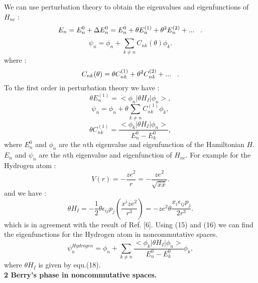 \documentclass[a4paper,a4paper]{article}
\begin{document}
We can use perturbation theory to
obtain the eigenvalues and eigenfunctions of $H_{nc}$ :
\begin{equation}
E_{n}=E^{0}_{n}+\Delta E^{0}_{n}=E^{0}_{n}+\theta E^{(1)}_{n}+\theta^{2}
E^{(2)}_{n}+...\hspace{.3cm} .
\end{equation}
\begin{equation}
\psi_{n}=\phi_{n}+ \sum_{k\neq n}C_{nk}(\theta)\phi_{k} .
\end{equation}
where :
\begin{equation}
C_{nk}(\theta)=\theta C^{(1)}_{nk}+\theta^{2} C^{(2)}_{nk}+...\hspace{.3cm}
.
\end{equation}
To the first order in perturbation theory we have :
\begin{equation}
\theta E^{(1)}_{n}= <\phi_{n}|\theta H_{I} |\phi_{n}> ,
\end{equation}
\begin{equation}
\psi_{n}=\phi_{n}+\theta \sum_{k\neq n}C^{(1)}_{nk}\phi_{k} ,
\end{equation}
\begin{equation}
\theta C^{(1)}_{nk}=\frac{<\phi_{k}|\theta
H_{I}|\phi_{n}>}{E^{0}_{n}-E_{k}^{0}} ,
\end{equation}
where $E^{0}_{n}$ and $\phi_{n}$ are the $n$th eigenvalue and
eigenfunction of the Hamiltonian $H$. $E_{n}$ and $\psi_{n}$ are
the $n$th eigenvalue and eigenfunction of $H_{nc}$. For example
for the Hydrogen atom :
\begin{equation}
V(r)=-\frac{ze^{2}}{r}=-\frac{ze^{2}}{\sqrt{\hat{x}\hat{x}}} .
\end{equation}
and we have :
\begin{equation}
\theta H_{I}=-\frac{1}{2}\theta
\epsilon_{ij}p_{j}(\frac{x^{i}ze^{2}}{r^{3}})=-ze^{2}\theta\frac{x_{i}\epsilon_{ij}p_{j}}{2r^{3}}
.
\end{equation}
which is in agreement with the result of Ref. [6]. Using (15) and
(16) we can find the eigenfunctions for the Hydrogen atom in
noncommutative spaces.
\begin{equation}
\psi_{n}^{Hydrogen}=\phi_{n}+ \sum_{k\neq n}\frac{<\phi_{k}|
\theta H_{I}|\phi_{n}>}{E^{0}_{n}-E^{0}_{k}}\phi_{k} ,
\end{equation}
where $\theta H_{I}$ is given by equ.(18).\\

\textbf{2 Berry's phase in noncommutative spaces. }\\
\end{document}
